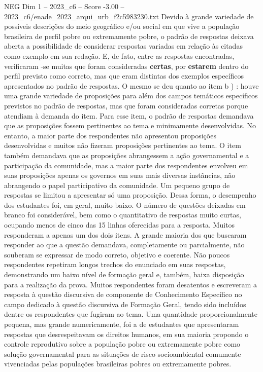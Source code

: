 \begin{textsample}{NEG Dim 1 – 2023\_c6 – Score -3.00 – 2023\_c6/enade\_2023\_arqui\_urb\_f2c5983230.txt}
Devido à grande variedade de possíveis descrições do meio geográfico e/ou social em que vive a população brasileira de perfil pobre ou extremamente pobre, o padrão de respostas deixava aberta a possibilidade de considerar respostas variadas em relação às citadas como exemplo em sua redação.
E, de fato, entre as respostas encontradas, verificaram -se muitas que foram consideradas \textbf{certas}, por \textbf{estarem} dentro do perfil previsto como correto, mas que eram distintas dos exemplos específicos apresentados no padrão de respostas.
O mesmo se deu quanto ao item b ) : houve uma grande variedade de proposições para além dos campos temáticos específicos previstos no padrão de respostas, mas que foram consideradas corretas porque atendiam à demanda do item.
Para esse item, o padrão de respostas demandava que as proposições fossem pertinentes ao tema e minimamente desenvolvidas.
No entanto, a maior parte dos respondentes não apresentou proposições desenvolvidas e muitos não fizeram proposições pertinentes ao tema.
O item também demandava que as proposições abrangessem a ação governamental e a participação da comunidade, mas a maior parte dos respondentes envolveu em suas proposições apenas os governos em suas mais diversas instâncias, não abrangendo o papel participativo da comunidade.
Um pequeno grupo de respostas se limitou a apresentar só uma proposição.
Dessa forma, o desempenho dos estudantes foi, em geral, muito baixo.
O número de questões deixadas em branco foi considerável, bem como o quantitativo de respostas muito curtas, ocupando menos de cinco das 15 linhas oferecidas para a resposta.
Muitos responderam a apenas um dos dois itens.
A grande maioria dos que buscaram responder ao que a questão demandava, completamente ou parcialmente, não souberam se expressar de modo correto, objetivo e coerente.
Não poucos respondentes repetiram longos trechos do enunciado em suas respostas, demonstrando um baixo nível de formação geral e, também, baixa disposição para a realização da prova.
Muitos respondentes foram desatentos e escreveram a resposta à questão discursiva de componente de Conhecimento Específico no campo dedicado à questão discursiva de Formação Geral, tendo sido incluídos dentre os respondentes que fugiram ao tema.
Uma quantidade proporcionalmente pequena, mas grande numericamente, foi a de estudantes que apresentaram respostas que desrespeitavam os direitos humanos, em sua maioria propondo o controle reprodutivo sobre a população pobre ou extremamente pobre como solução governamental para as situações de risco socioambiental comumente vivenciadas pelas populações brasileiras pobres ou extremamente pobres.

\end{textsample}
